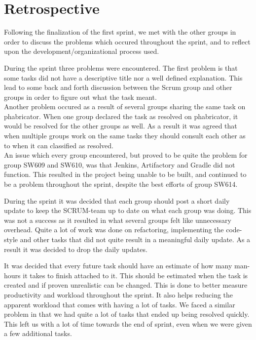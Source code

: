 \section{Retrospective}\label{S1Retro}
Following the finalization of the first sprint, we met with the other
groups in order to discuss the problems which occured
throughout the sprint, and to reflect upon the development/organizational
process used.\nl

During the sprint three problems were encountered. The first problem is that
some tasks did not have a descriptive title nor a well defined explanation.
This lead to some back and forth discussion between the Scrum group and other
groups in order to figure out what the task meant.\\
Another problem occured as a result of several groups sharing the same task on
phabricator. When one group declared the task as resolved on phabricator, it
would be resolved for the other groups as well. As a result it was agreed that
when multiple groups work on the same tasks they should consult each other as to
when it can classified as resolved.\\
An issue which every group encountered, but proved to be quite the problem for
group SW609 and SW610, was that Jenkins, Artifactory and Gradle did not
function.
This resulted in the project being unable to be built, and continued to be a
problem throughout the sprint, despite the best efforts of group SW614.\nl

During the sprint it was decided that each group should post a short daily
update to keep the SCRUM-team up to date on what each group was doing. This was
not a success as it resulted in what several groups felt like unnecessary
overhead. Quite a lot of work was done on refactoring, implementing the
code-style and other tasks that did not quite result in a meaningful daily
update. As a result it was decided to drop the daily updates.\nl

It was decided that every future task should have an estimate of how many
man-hours it takes to finish attached to it. This should be estimated when the
task is created and if proven unrealistic can be changed. This is done to
better measure productivity and workload throughout the sprint. It also helps
reducing the apparent workload that comes with having a lot of tasks. We faced a
similar problem in that we had quite a lot of tasks that ended up being resolved
quickly. This left us with a lot of time towards the end of sprint, even when we
were given a few additional tasks.

